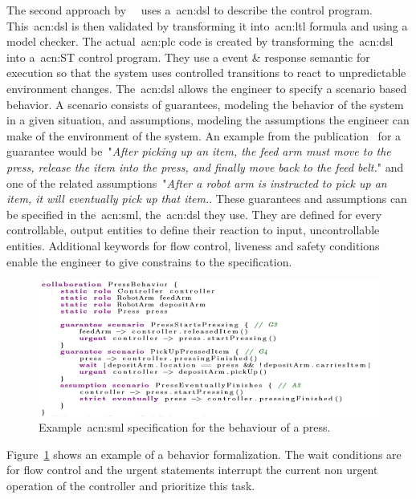 The second approach by~\citeauthor{10.1007/978-3-319-74730-9_23}~\cite{10.1007/978-3-319-74730-9_23} uses a~\acrfull{acn:dsl} to describe the control program.
This~\acrshort{acn:dsl} is then validated by transforming it into~\acrshort{acn:ltl} formula and using a model checker.
The actual~\acrshort{acn:plc} code is created by transforming the~\acrshort{acn:dsl} into a~\acrshort{acn:ST} control program.
They use a event \& response semantic for execution so that the system uses controlled transitions to react to unpredictable environment changes.
The~\acrshort{acn:dsl} allows the engineer to specify a scenario based behavior.
A scenario consists of guarantees, modeling the behavior of the system in a given situation, and assumptions, modeling the assumptions the engineer can make of the environment of the system.
An example from the publication~\cite{10.1007/978-3-319-74730-9_23} for a guarantee would be~"\textit{After picking up an item, the feed arm must move to the press, release the item into the press, and finally move back to the feed belt.}" and one of the related assumptions~"\textit{After a robot arm is instructed to pick up an item, it will eventually pick up that item.}.
These guarantees and assumptions can be specified in the~\acrfull{acn:sml}, the~\acrshort{acn:dsl} they use.
They are defined for every controllable, output entities to define their reaction to input, uncontrollable entities.
Additional keywords for flow control, liveness and safety conditions enable the engineer to give constrains to the specification.
\begin{figure}
	\centering
	\includegraphics[width=\textwidth]{./Figures/sml_press_beh.png}
	\caption[\acrshort{acn:sml} specification example.]{Example~\acrshort{acn:sml} specification for the behaviour of a press.~\cite{10.1007/978-3-319-74730-9_23}}
	\label{fig:sml_press}
\end{figure}
Figure~\ref{fig:sml_press} shows an example of a behavior formalization.
The wait conditions are for flow control and the urgent statements interrupt the current non urgent operation of the controller and prioritize this task.
